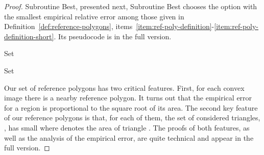 \documentclass[11pt,english]{article}
\numberwithin{figure}{section}
\newcommand{\Best}{{\sf Best}\xspace}
\newcommand{\BestFixed}{{\sf Best For Fixed Base}\xspace}
\begin{document}
\begin{proof}
\ifnum{}
Subroutine \Best, presented next,
\else
Subroutine \Best
\fi
chooses the option with the smallest empirical relative error among those given in Definition~\ref{def:reference-polygons}, items~\ref{item:ref-poly-definition}-\ref{item:ref-poly-definition-short}.
\ifnum{}
Its pseudocode is in the {\color{black} full version}.
\else
\begin{algorithm}
\caption{Subroutine \Best used in Algorithm~\ref{alg:convexity-dist-approximation}.}
\label{alg:subroutine-best}
\DontPrintSemicolon
\BlankLine
{}
\nl Set 

\nl\quad\label{step:forall-best-type2}

\nl\quad \Return 

\end{algorithm}


\begin{algorithm}\label{alg:subroutine-best-fixed-base}
\caption{Subroutine \BestFixed used in Algorithm~\ref{alg:subroutine-best}.}
\label{alg:subroutine-best-fixed-base}
\DontPrintSemicolon
\BlankLine
\nl Set \;
\nl {}

\nl \Return 

\end{algorithm}
\fi

\ifnum{}
Our set of reference polygons has two critical features. First, for each convex image there is a nearby reference polygon. It turns out that the empirical error for a region is proportional to the square root of its area. The second key feature of our reference polygons is that, for each of them, the set of considered triangles, , has small  where  denotes the area of triangle . The proofs of both features, as well as the analysis of the empirical error, are quite technical and appear in the {\color{black} full version}.\end{proof}
\end{document}
